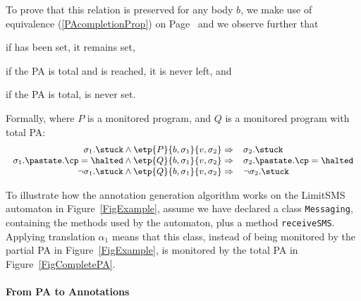 To prove that this relation is preserved for any body \(b\), we make
use of equivalence (\ref{PAcompletionProp}) on
Page~\pageref{PAcompletionProp} and we observe further that
\begin{inparaenum}
\item if \stuck has been set, it remains set,
\item if the PA is total and \halted is reached, it is never left, and
\item if the PA is total, \stuck is never set.
\end{inparaenum} Formally, where \(P\) is a monitored program, and
\(Q\) is a monitored program with total PA:
\[{\small
\begin{array}[t]{rl}
\sigma_1.\stuck \wedge \etp{P}{b,\sigma_1}{v,\sigma_2} \Rightarrow &
\sigma_2.\stuck \\
\sigma_1.\pastate.\cp = \halted \wedge
\etp{Q}{b,\sigma_1}{v,\sigma_2} \Rightarrow &
\sigma_2.\pastate.\cp = \halted \\
\neg \sigma_1.\stuck \wedge \etp{Q}{b,\sigma_1}{v,\sigma_2} \Rightarrow &
\neg \sigma_2.\stuck
\end{array}}
\]


To illustrate how the annotation generation algorithm 
works on the LimitSMS automaton in Figure~\ref{FigExample}, assume
we have declared a class \texttt{Messaging}, containing the
methods used by the automaton, plus a method \texttt{receiveSMS}.
Applying translation \(\alpha_1\) means that this class, instead of
being monitored by the partial PA in Figure~\ref{FigExample}, is
monitored by the total PA in Figure~\ref{FigCompletePA}.


\paragraph{From PA to Annotations}

